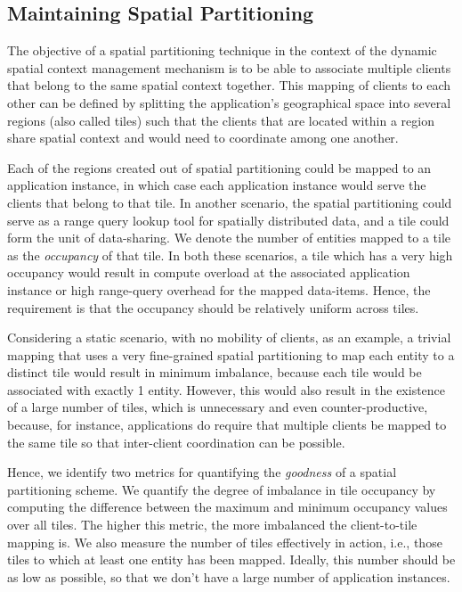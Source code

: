 \subsection{Maintaining Spatial Partitioning}
The objective of a spatial partitioning technique in the context of the dynamic spatial context management mechanism is to be able to associate multiple clients that belong to the same spatial context together. This mapping of clients to each other can be defined by splitting the application's geographical space into several regions (also called tiles) such that the clients that are located within a region share spatial context and would need to coordinate among one another. 
\par Each of the regions created out of spatial partitioning could be mapped to an application instance, in which case each application instance would serve the clients that belong to that tile. In another scenario, the spatial partitioning could serve as a range query lookup tool for spatially distributed data, and a tile could form the unit of data-sharing. We denote the number of entities mapped to a tile as the \textit{occupancy} of that tile. In both these scenarios, a tile which has a very high occupancy would result in compute overload at the associated application instance or high range-query overhead for the mapped data-items.  Hence, the requirement is that the occupancy should be relatively uniform across tiles. 
\par Considering a static scenario, with no mobility of clients, as an example, a trivial mapping that uses a very fine-grained spatial partitioning to map each entity to a distinct tile would result in minimum imbalance, because each tile would be associated with exactly 1 entity. However, this would also result in the existence of a large number of tiles, which is unnecessary and even counter-productive, because, for instance, applications do require that multiple clients be mapped to the same tile so that inter-client coordination can be possible.
\par Hence, we identify two metrics for quantifying the \textit{goodness} of a spatial partitioning scheme. We quantify the degree of imbalance in tile occupancy by computing the difference between the maximum and minimum occupancy values over all tiles. The higher this metric, the more imbalanced the client-to-tile mapping is. We also measure the number of tiles effectively in action, i.e., those tiles to which at least one entity has been mapped. Ideally, this number should be as low as possible, so that we don't have a large number of application instances.
